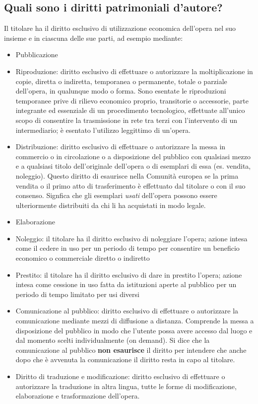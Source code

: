 \subsection{Quali sono i diritti patrimoniali d'autore?}
Il titolare ha il diritto esclusivo di utilizzazione economica dell'opera nel suo insieme
e in ciascuna delle sue parti, ad esempio mediante:
\begin{itemize}
    \item Pubblicazione
    \item Riproduzione: diritto esclusivo di effettuare o autorizzare la moltiplicazione in copie, diretta o indiretta,
    temporanea o permanente, totale o parziale dell'opera, in qualunque modo o forma. \newline
    Sono esentate le riproduzioni temporanee prive di rilievo economico proprio, transitorie o accessorie,
    parte integrante ed essenziale di un procedimento tecnologico, effettuate all'unico scopo di consentire la trasmissione in rete tra terzi
    con l'intervento di un intermediario; è esentato l'utilizzo leggittimo di un'opera.
    \item Distribuzione: diritto esclusivo di effettuare o autorizzare la messa in commercio o in circolazione
    o a disposizione del pubblico con qualsiasi mezzo e a qualsiasi titolo dell'originale dell'opera o di esemplari
    di essa (es. vendita, noleggio).\newline
    Questo diritto di esaurisce nella Comunità europea se la prima vendita o il primo atto di trasferimento è effettuato
    dal titolare o con il suo consenso. Signfica che gli esemplari \textit{usati} dell'opera possono essere ulteriormente
    distribuiti da chi li ha acquistati in modo legale.
    \item Elaborazione
    \item Noleggio: il titolare ha il diritto esclusivo di noleggiare l'opera; azione intesa come il cedere in uso per
    un periodo di tempo per consentire un beneficio economico o commerciale diretto o indiretto
    \item Prestito: il titolare ha il diritto esclusivo di dare in prestito l'opera; azione intesa come cessione in uso fatta
    da istituzioni aperte al pubblico per un periodo di tempo limitato per usi diversi
    \item Comunicazione al pubblico: diritto esclusivo di effettuare o autorizzare la comunicazione mediante
    mezzi di diffusione a distanza. Comprende la messa a disposizione del pubblico in modo che l'utente possa avere
    accesso dal luogo e dal momento scelti individualmente (on demand).\newline
    Si dice che la comunicazione al pubblico \textbf{non esaurisce} il diritto per intendere che anche dopo
    che è avvenuta la comunicazione il diritto resta in capo al titolare.
    \item Diritto di traduzione e modificazione: diritto esclusivo di effettuare o autorizzare la traduzione in
    altra lingua, tutte le forme di modificazione, elaborazione e trasformazione dell'opera.
\end{itemize}


